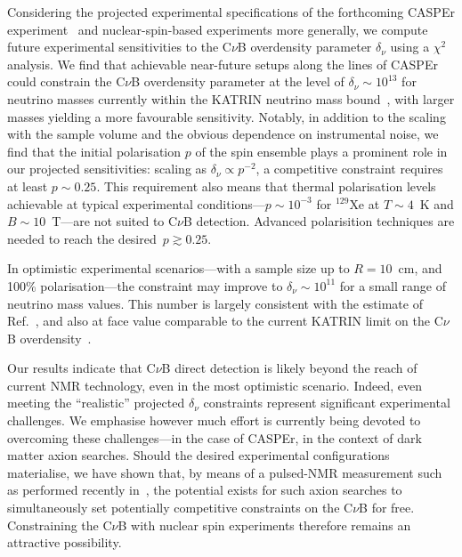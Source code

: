 \documentclass[aps,prd,10pt,twocolumn,superscriptaddress,floatfix,nofootinbib,amsmath,amssymb,altaffilletter,preprintnumbers]{revtex4-1}
\begin{document}
Considering the projected experimental specifications of the forthcoming CASPEr experiment~\cite{Budker:2013hfa,JacksonKimball:2017elr,Walter:2025ldb} and nuclear-spin-based experiments more generally, we compute future experimental sensitivities to the C$\nu$B overdensity parameter $\delta_\nu$ using a $\chi^2$ analysis.
We find that achievable near-future setups along the lines of CASPEr could constrain the C$\nu$B overdensity parameter at the level of $\delta_\nu \sim 10^{13}$ for neutrino masses currently within the KATRIN neutrino mass bound~\cite{KATRIN:2024cdt}, with larger masses yielding a more favourable sensitivity.
Notably, in addition to the scaling with the sample volume and the obvious dependence on instrumental noise, we find that the initial polarisation $p$ of the spin ensemble plays a prominent role in our projected sensitivities: scaling as $\delta_\nu \propto p^{-2}$, a competitive constraint requires at least $p \sim 0.25$.  This requirement also means that thermal polarisation levels achievable at typical experimental conditions---$p \sim 10^{-3}$ for $^{129}$Xe at $T\sim 4$~K and $B\sim 10$~T---are not suited to C$\nu$B detection. Advanced polarisition techniques are needed to reach the desired~$p\gtrsim 0.25$. 


In optimistic experimental scenarios---with a sample size up to $R = 10$~cm, and 100\% polarisation---the constraint may improve to $\delta_\nu \sim 10^{11}$ for a small range of neutrino mass values. This number is largely consistent with the estimate of Ref.~\cite{Arvanitaki:2024taq},  and also at face value comparable to the current KATRIN limit on the C$\nu$B overdensity~\cite{KATRIN:2022kkv}.


Our results indicate that C$\nu$B direct detection is likely beyond the reach of current NMR technology, even in the most optimistic scenario. Indeed, even meeting the ``realistic'' projected $\delta_\nu$ constraints represent significant experimental challenges.  We emphasise however much effort is currently being devoted to overcoming these challenges---in the case of CASPEr, in the context of dark matter axion searches. Should the desired experimental configurations materialise, we have shown that, by means of a pulsed-NMR measurement such as performed recently in~\cite{Walter:2025ldb},
the potential exists for such axion searches to simultaneously set potentially competitive constraints on the C$\nu$B for free. Constraining the C$\nu$B with nuclear spin experiments therefore remains an attractive possibility.
\end{document}
